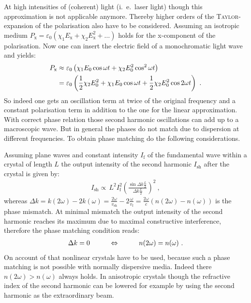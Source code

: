 \documentclass{protokoll_en}
\begin{document}
At high intensities of (coherent) light (i.\ e.\ laser light) though this approximation is not applicable anymore. Thereby higher orders of the \textsc{Taylor}-expansion of the polarisation also have to be considered. Assuming an isotropic medium $P_\mathrm{x} = \varepsilon_0 \left( \chi_1 E_\mathrm{x} + \chi_2 E^2_\mathrm{x} + \dots \right)$ holds for the x-component of the polarisation. Now one can insert the electric field of a monochromatic light wave and yields:
\begin{align}
P_\mathrm{x} &\approx \varepsilon_0 \left( \chi_1 E_0 \cos{\omega t} + \chi_2 E^2_0 \cos^2{\omega t} \right) \\
             &= \varepsilon_0 \left( \frac{1}{2} \chi_2 E^2_0 + \chi_1 E_0 \cos{\omega t} + \frac{1}{2} \chi_2 E^2_0 \cos{2 \omega t} \right) \ \ldotp
\end{align}
So indeed one gets an oscillation term at twice of the original frequency and a constant polarisation term in addition to the one for the linear approximation. With correct phase relation those second harmonic oscillations can add up to a macroscopic wave. But in general the phases do not match due to dispersion at different frequencies. To obtain phase matching do the following considerations.

Assuming plane waves and constant intensity $I_\mathrm{f}$ of the fundamental wave within a crystal of length $L$ the output intensity of the second harmonic $I_\mathrm{sh}$ after the crystal is given by:
\begin{align}
I_{\mathrm{sh}}\propto \, L^2 I^2_{\mathrm{f}} \left( \frac{\sin{\Delta k \frac{L}{2}}}{\Delta k \frac{L}{2}} \right)^2 \ ,
\end{align}
whereas $\Delta k = k(2\omega) - 2 k(\omega) = \frac{2\omega}{v_\mathrm{sh}} - 2 \frac{\omega}{v_\mathrm{f}} = \frac{2\omega}{c} \left( n(2\omega) - n(\omega) \right)$ is the phase mismatch. At minimal mismatch the output intensity of the second harmonic reaches its maximum due to maximal constructive interference, therefore the phase matching condition reads:
\begin{align}
\Delta k = 0 \hspace{1cm} \Leftrightarrow \hspace{1cm} n(2\omega) = n(\omega) \ \ldotp
\end{align}
On account of that nonlinear crystals have to be used, because such a phase matching is not possible with normally dispersive media. Indeed there $n(2\omega) > n(\omega)$ always holds. In anisotropic crystals though the refractive index of the second harmonic can be lowered for example by using the second harmonic as the extraordinary beam.
\end{document}
